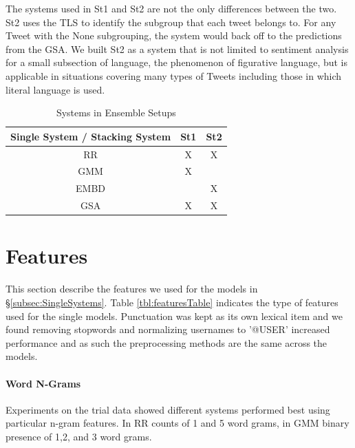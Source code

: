 \documentclass[11pt,letterpaper]{article}
\begin{document}
The systems used in {\sc St1} and {\sc St2} are not the only differences between the two. {\sc St2} uses the TLS to identify the subgroup that each tweet belongs to. For any Tweet with the {\sc None} subgrouping, the system would back off to the predictions from the GSA. We built {\sc St2} as a system that is not limited to sentiment analysis for a small subsection of language, the phenomenon of figurative language, but is applicable in situations covering many types of Tweets including those in which literal language is used.

\begin{table}[ht!]
\begin{center}
\begin{tabular}{c || c c}
Single System / Stacking System & {\sc St1} & {\sc St2}\\
\hline
{\sc RR} & X & X\\
{\sc GMM} & X & \\
{\sc EMBD} & &X\\
{\sc GSA} & X&X \\
\end{tabular}
\end{center}
\caption{Systems in Ensemble Setups}
\label{tbl:stackingTable}
\end{table}

\section{Features}
\label{sec:Features}

This section describe the features we used for the models in \S \ref{subsec:SingleSystems}. Table \ref{tbl:featuresTable} indicates the type of features used for the single models. Punctuation was kept as its own lexical item and we found removing stopwords and normalizing usernames to '@USER'  increased performance and as such the preprocessing methods are the same across the models. 

\paragraph{Word N-Grams}
Experiments on the trial data showed different systems performed best using particular n-gram features. In {\sc RR} counts of 1 and 5 word grams, in GMM binary presence of 1,2, and 3 word grams. 
\end{document}
